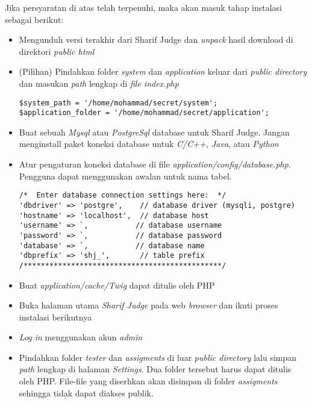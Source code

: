Jika persyaratan di atas telah terpenuhi, maka akan masuk tahap instalasi sebagai berikut:
\begin{itemize}
	\item Mengunduh versi terakhir dari Sharif Judge dan \textit{unpack} hasil download di direktori \textit{public html}
	\item (Pilihan) Pindahkan folder \textit{system} dan \textit{application} keluar dari \textit{public directory} dan
	masukan \textit{path} lengkap di \textit{file index.php} 
	\begin{lstlisting}[backgroundcolor = \color{lightgray}]
$system_path = '/home/mohammad/secret/system';
$application_folder = '/home/mohammad/secret/application';
	\end{lstlisting}
	\item Buat sebuah \textit{Mysql} atau \textit{PostgreSql} database untuk Sharif Judge. Jangan menginstall paket koneksi database untuk \textit{C/C++, Java}, atau \textit{Python}
	\item Atur pengaturan koneksi database di file \textit{application/config/database.php}. Pengguna dapat menggunakan awalan untuk nama tabel.
	\begin{lstlisting}[backgroundcolor = \color{lightgray}]
/*  Enter database connection settings here:  */
'dbdriver' => 'postgre',    // database driver (mysqli, postgre)
'hostname' => 'localhost',  // database host
'username' => `,           // database username
'password' => `,           // database password
'database' => `,           // database name
'dbprefix' => 'shj_',       // table prefix
/**********************************************/
	\end{lstlisting}
	\item Buat \textit{application/cache/Twig} dapat ditulis oleh PHP
	\item Buka halaman utama \textit{Sharif Judge} pada web \textit{browser} dan ikuti proses instalasi berikutnya
	\item \textit{Log in} menggunakan akun \textit{admin}
	\item Pindahkan folder \textit{tester} dan \textit{assigments} di luar \textit{public directory} lalu simpan \textit{path} lengkap di halaman \textit{Settings}. Dua folder tersebut harus dapat ditulis oleh PHP. File-file yang diserhkan akan disimpan di folder \textit{assigments} sehingga tidak dapat diakses publik.
\end{itemize}

